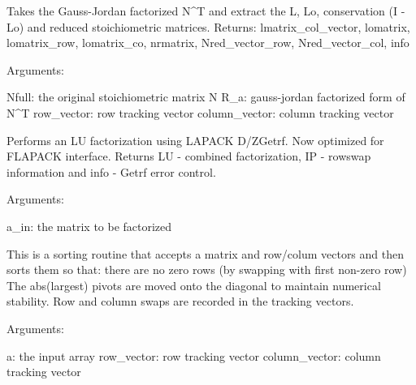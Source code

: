 \documentclass[a4paper,11pt,english]{sphinxmanual}
\begin{document}
\begin{fulllineitems}

\begin{fulllineitems}
\label{modules_doc:cbmpy.PyscesStoich.Stoich.L_split_R}
Takes the Gauss-Jordan factorized N\textasciicircum{}T and extract the L, Lo, conservation (I -Lo) and reduced stoichiometric matrices. Returns: lmatrix\_col\_vector, lomatrix, lomatrix\_row, lomatrix\_co, nrmatrix, Nred\_vector\_row, Nred\_vector\_col, info

Arguments:

Nfull: the original stoichiometric matrix N
R\_a: gauss-jordan factorized form of N\textasciicircum{}T
row\_vector: row tracking vector
column\_vector: column tracking vector

\end{fulllineitems}


\begin{fulllineitems}
\label{modules_doc:cbmpy.PyscesStoich.Stoich.PLUfactorize}
Performs an LU factorization using LAPACK D/ZGetrf. Now optimized for FLAPACK interface.
Returns LU - combined factorization, IP - rowswap information and info - Getrf error control.

Arguments:

a\_in: the matrix to be factorized

\end{fulllineitems}


\begin{fulllineitems}
\label{modules_doc:cbmpy.PyscesStoich.Stoich.PivotSort}
This is a sorting routine that accepts a matrix and row/colum vectors
and then sorts them so that: there are no zero rows (by swapping with first
non-zero row) The abs(largest) pivots are moved onto the diagonal to maintain
numerical stability. Row and column swaps are recorded in the tracking vectors.

Arguments:

a: the input array
row\_vector: row tracking vector
column\_vector: column tracking vector


\end{fulllineitems}
\end{fulllineitems}
\end{document}
